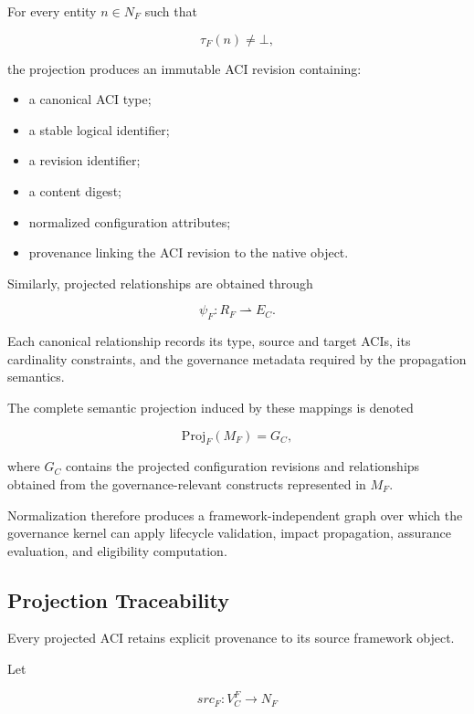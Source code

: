 \documentclass[10pt]{article}
\begin{document}
For every entity $n\in N_F$ such that

\[
\tau_F(n)\neq\bot,
\]

the projection produces an immutable ACI revision containing:

\begin{itemize}
	\item a canonical ACI type;
	\item a stable logical identifier;
	\item a revision identifier;
	\item a content digest;
	\item normalized configuration attributes;
	\item provenance linking the ACI revision to the native object.
\end{itemize}

Similarly, projected relationships are obtained through

\[
	\psi_F :
	R_F
	\rightharpoonup
	E_C.
\]

Each canonical relationship records its type, source and target ACIs, its
cardinality constraints, and the governance metadata required by the
propagation semantics.

The complete semantic projection induced by these mappings is denoted

\begin{equation}
	\mathrm{Proj}_F(M_F)
	=
	G_C,
	\label{eq:framework_projection}
\end{equation}

where $G_C$ contains the projected configuration revisions and relationships
obtained from the governance-relevant constructs represented in $M_F$.

Normalization therefore produces a framework-independent graph over which the
governance kernel can apply lifecycle validation, impact propagation, assurance
evaluation, and eligibility computation.

\subsection{Projection Traceability}

Every projected ACI retains explicit provenance to its source framework object.

Let

\begin{equation}
	src_F :
	V_C^{F}
	\rightarrow
	N_F
	\label{eq:projection_source}
\end{equation}
\end{document}
